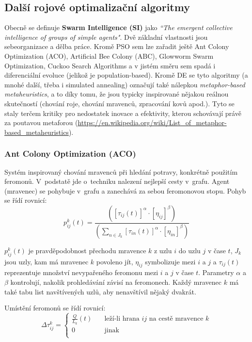 \subsection{Další rojové optimalizační algoritmy}
Obecně se definuje \textbf{Swarm Intelligence (SI)} jako \textit{“The emergent collective intelligence of groups of simple agents"}. Dvě základní vlastnosti jsou sebeorganizace a dělba práce. Kromě PSO sem lze zařadit ještě Ant Colony Optimization (ACO), Artificial Bee Colony (ABC), Glowworm Swarm Optimization, Cuckoo Search Algorithms a v jistém směru sem spadá i diferenciální evoluce (jelikož je population-based). Kromě DE se tyto algoritmy (a mnohé další, třeba i simulated annealing)  označují také nálepkou \textit{metaphor-based metaheuristics}, a to díky tomu, že jsou typicky inspirované nějakou reálnou skutečností (chování roje, chování mravenců, zpracování kovů apod.). Tyto se staly terčem kritiky pro nedostatek inovace a efektivity, kterou schovávají právě za poutavou metaforou (\url{https://en.wikipedia.org/wiki/List_of_metaphor-based_metaheuristics}).

\subsubsection{Ant Colony Optimization (ACO)}
Systém inspirovaný chování mravenců při hledání potravy, konkrétně použitím feromonů. V~podstatě jde o~techniku nalezení nejlepší cesty v~grafu. Agent (mravenec) se pohybuje v~grafu a zanechává za sebou feromonovou stopu. Pohyb se řídí rovnicí:
$$p^k_{ij}(t) = \frac{([\tau_{ij}(t)]^\alpha \cdot [\eta_{ij}]^\beta)}{(\sum\limits_{n \in J_k}[\tau_{in}(t)]^\alpha \cdot [\eta_{in}]^\beta)}$$

$p^k_{ij}(t)$ je pravděpodobnost přechodu mravence $k$ z uzlu $i$ do uzlu $j$ v čase $t$, $J_k$ jsou uzly, kam má mravenec $k$ povoleno jít, $\eta_{ij}$ symbolizuje  mezi $i$ a $j$ a $\tau_{ij}(t)$ reprezentuje množství nevypařeného feromonu mezi $i$ a $j$ v čase $t$. Parametry $\alpha$ a $\beta$ kontrolují, nakolik prohledávání závisí na feromonech. Každý mravenec $k$ má také tabu list navštívených uzlů, aby nenavštívil nějaký dvakrát.

Umístění feromonů se řídí rovnicí:
\[
\Delta\tau^k_{ij} = 
\begin{cases}
	\frac{Q}{L_k}(t) 	& \quad \text{leží-li hrana $ij$ na cestě mravence $k$} \\
	0 					& \quad \text{jinak}\\
\end{cases}
\]

